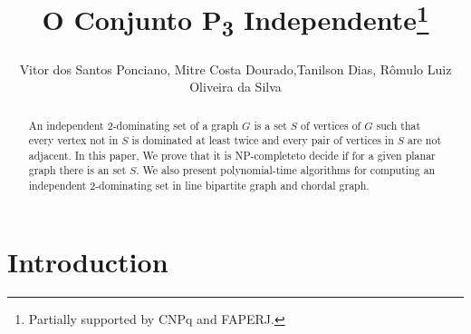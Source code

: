 \documentclass[a4paper,8pt]{article}
\theoremstyle{plain}
\begin{document}
%
\title{O Conjunto P\textsubscript{3} Independente\thanks{Partially supported by CNPq and FAPERJ.}}
%
%
\author{Vitor dos Santos Ponciano, 
Mitre Costa Dourado,Tanilson Dias,
Rômulo Luiz Oliveira da Silva}


%
\maketitle              %
%
\begin{abstract}

 An independent 2-dominating set of a graph $G$ is a set $S$ of vertices of $G$ such that every vertex not in $S$ is dominated at least twice and every pair of vertices in $S$ are not adjacent. In this paper, We prove that it is NP-completeto decide if for a given planar graph there is an set $S$. We also present polynomial-time algorithms for computing an independent 2-dominating set in line bipartite graph and chordal graph. 
 



\end{abstract}
%
\section{Introduction} \label{sec:int}
\end{document}
